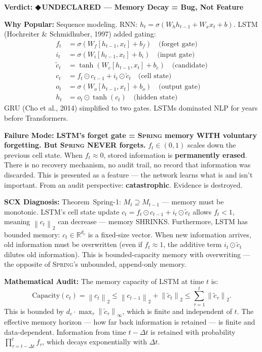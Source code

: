 \documentclass[12pt,a4paper]{article}
\theoremstyle{definition}
\newcommand{\guilty}{{\color{guiltycolor}\textbf{◆\,UNDECLARED}}}
\newcommand{\Spring}{\textsc{Spring}}
\newcommand{\R}{\mathbb{R}}
\newcommand{\norm}[1]{\left\lVert#1\right\rVert}
\newcommand{\auditHeader}[1]{\medskip\noindent\textbf{\large #1}\medskip}
\newcommand{\whyPopular}{\noindent\textbf{Why Popular:} }
\newcommand{\whyFail}{\noindent\textbf{Failure Mode:} }
\newcommand{\diagnosis}{\noindent\textbf{SCX Diagnosis:} }
\newcommand{\mathAudit}{\noindent\textbf{Mathematical Audit:} }
\begin{document}
\auditHeader{Verdict: \guilty{} — Memory Decay = Bug, Not Feature}

\whyPopular{} Sequence modeling. RNN: $h_t = \sigma(W_h h_{t-1} + W_x x_t + b)$. LSTM (Hochreiter \& Schmidhuber, 1997) added gating:
\begin{align}
    f_t &= \sigma(W_f[h_{t-1}, x_t] + b_f) \quad \text{(forget gate)} \\
    i_t &= \sigma(W_i[h_{t-1}, x_t] + b_i) \quad \text{(input gate)} \\
    \tilde{c}_t &= \tanh(W_c[h_{t-1}, x_t] + b_c) \quad \text{(candidate)} \\
    c_t &= f_t \odot c_{t-1} + i_t \odot \tilde{c}_t \quad \text{(cell state)} \\
    o_t &= \sigma(W_o[h_{t-1}, x_t] + b_o) \quad \text{(output gate)} \\
    h_t &= o_t \odot \tanh(c_t) \quad \text{(hidden state)}
\end{align}
GRU (Cho et al., 2014) simplified to two gates. LSTMs dominated NLP for years before Transformers.

\whyFail{} \textbf{LSTM's forget gate = \Spring{} memory WITH voluntary forgetting. But \Spring{} NEVER forgets.} $f_t \in (0,1)$ scales down the previous cell state. When $f_t \approx 0$, stored information is \textbf{permanently erased}. There is no recovery mechanism, no audit trail, no record that information was discarded. This is presented as a feature — the network learns what is and isn't important. From an audit perspective: \textbf{catastrophic}. Evidence is destroyed.

\diagnosis{} Theorem~Spring-1: $M_t \supseteq M_{t-1}$ — memory must be monotonic. LSTM's cell state update $c_t = f_t \odot c_{t-1} + i_t \odot \tilde{c}_t$ allows $f_t < 1$, meaning $\norm{c_t}_2$ can decrease — memory SHRINKS. Furthermore, LSTM has bounded memory: $c_t \in \R^{d_c}$ is a fixed-size vector. When new information arrives, old information must be overwritten (even if $f_t \approx 1$, the additive term $i_t \odot \tilde{c}_t$ dilutes old information). This is bounded-capacity memory with overwriting — the opposite of \Spring{}'s unbounded, append-only memory.

\mathAudit{} The memory capacity of LSTM at time $t$ is:
\[
\text{Capacity}(c_t) = \norm{c_t}_2 \le \norm{c_{t-1}}_2 + \norm{\tilde{c}_t}_2 \le \sum_{\tau=1}^t \norm{\tilde{c}_\tau}_2.
\]
This is bounded by $d_c \cdot \max_\tau \norm{\tilde{c}_\tau}_\infty$, which is finite and independent of $t$. The effective memory horizon — how far back information is retained — is finite and data-dependent. Information from time $t - \Delta t$ is retained with probability $\prod_{\tau=t-\Delta t}^t f_\tau$, which decays exponentially with $\Delta t$.
\end{document}
